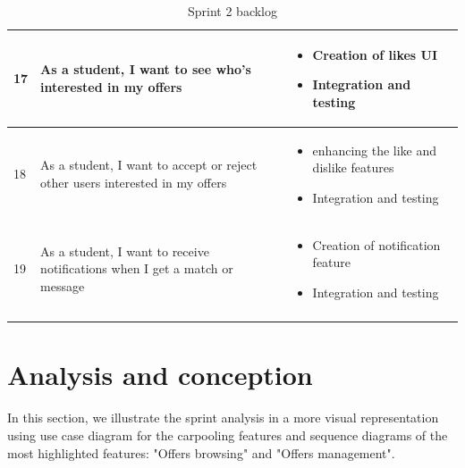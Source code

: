 \begin{longtable}{|l|p{6cm}|p{8cm}|}
17 & As a student, I want to see who’s interested in my offers & \begin{itemize}
    \item Creation of likes UI 
    \item Integration and testing
\end{itemize} \\ \hline

18 & As a student, I want to accept or reject other users interested in my offers & \begin{itemize}
    \item enhancing the like and dislike features
    \item Integration and testing
\end{itemize} \\ \hline

19 & As a student, I want to receive notifications when I get a match or message & \begin{itemize}
    \item Creation of notification feature
    \item Integration and testing
\end{itemize} \\ \hline
\caption{Sprint 2 backlog}
\label{Tab: Sprint 2 backlog}
\end{longtable}


\section{ Analysis and conception}
In this section, we illustrate the sprint analysis in a more visual representation using use case diagram for the carpooling features and sequence diagrams of the most highlighted features:
"Offers browsing" and "Offers management".

